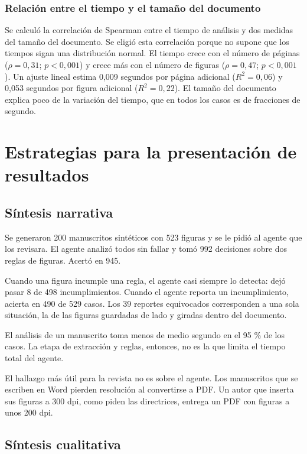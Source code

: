 \subsubsection*{Relación entre el tiempo y el tamaño del documento}

Se calculó la correlación de Spearman \cite{ref39} entre el tiempo de análisis y dos medidas del tamaño del documento. Se eligió esta correlación porque no supone que los tiempos sigan una distribución normal. El tiempo crece con el número de páginas ($\rho = 0{,}31$; $p < 0{,}001$) y crece más con el número de figuras ($\rho = 0{,}47$; $p < 0{,}001$). Un ajuste lineal estima 0,009 segundos por página adicional ($R^2 = 0{,}06$) y 0,053 segundos por figura adicional ($R^2 = 0{,}22$). El tamaño del documento explica poco de la variación del tiempo, que en todos los casos es de fracciones de segundo.

\section{Estrategias para la presentación de resultados}

\subsection{Síntesis narrativa}

Se generaron 200 manuscritos sintéticos con 523 figuras y se le pidió al agente que los revisara. El agente analizó todos sin fallar y tomó 992 decisiones sobre dos reglas de figuras. Acertó en 945.

Cuando una figura incumple una regla, el agente casi siempre lo detecta: dejó pasar 8 de 498 incumplimientos. Cuando el agente reporta un incumplimiento, acierta en 490 de 529 casos. Los 39 reportes equivocados corresponden a una sola situación, la de las figuras guardadas de lado y giradas dentro del documento.

El análisis de un manuscrito toma menos de medio segundo en el 95 \% de los casos. La etapa de extracción y reglas, entonces, no es la que limita el tiempo total del agente.

El hallazgo más útil para la revista no es sobre el agente. Los manuscritos que se escriben en Word pierden resolución al convertirse a PDF. Un autor que inserta sus figuras a 300 dpi, como piden las directrices, entrega un PDF con figuras a unos 200 dpi.

\subsection{Síntesis cualitativa}

